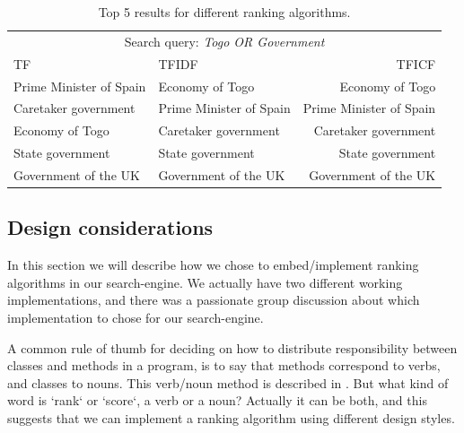 \begin{table}[b]
	\centering
\begin{tabular}{@{}llr@{}} \toprule
	\multicolumn{3}{c}{Search query: \textit{Togo OR Government}} \\ \cmidrule(r){1-3}
	TF 									& TFIDF 							& TFICF \\ \midrule
	Prime Minister of Spain 			& Economy of Togo 					& Economy of Togo \\
	Caretaker government 				& Prime Minister of Spain 			& Prime Minister of Spain \\
	Economy of Togo		    			& Caretaker government 				& Caretaker government \\
	State government 					& State government					& State government \\
	Government of the UK 	& Government of the UK 	& Government of the UK \\ \bottomrule
\end{tabular}
\caption{Top 5 results for different ranking algorithms.}	
\label{tab:comparisonRankingAlgorithms}
\end{table}


\subsection{Design considerations}
In this section we will describe how we chose to embed/implement ranking algorithms in our search-engine. We actually have two different working implementations, and there was a passionate group discussion about which implementation to chose for our search-engine.  

A common rule of thumb for deciding on how to distribute responsibility between classes and methods in a program, is to say that methods correspond to verbs, and classes to nouns. This verb/noun method is described in \cite[p.530]{BK}.
But what kind of word is `rank` or `score`, a verb or a noun? Actually it can be both, and this suggests that we can implement a ranking algorithm using different design styles.

